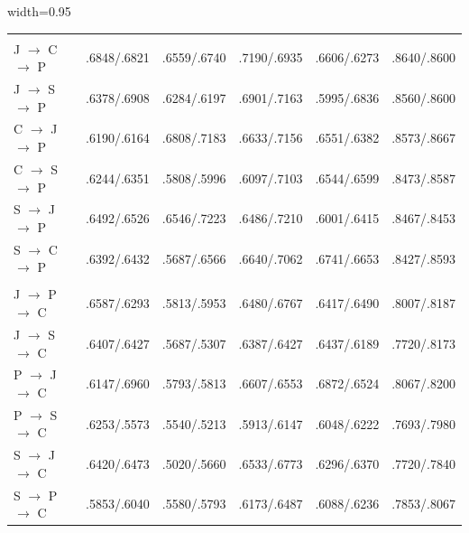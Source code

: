 \begin{table}[!htbp]
\begin{adjustbox}{width=0.95\columnwidth}
\begin{tabular}{@{}lccccc@{}}
\addlinespace[1pt]
\rowcolor{black!7}
\multicolumn{6}{@{}l}{\textit{Target Python (P)}} \\

J $\rightarrow$ C $\rightarrow$ P
& .6848/.6821 & .6559/.6740 & .7190/.6935 & .6606/.6273 & .8640/.8600 \\
J $\rightarrow$ S $\rightarrow$ P
& .6378/.6908 & .6284/.6197 & .6901/.7163 & .5995/.6836 & .8560/.8600 \\
C $\rightarrow$ J $\rightarrow$ P
& .6190/.6164 & .6808/.7183 & .6633/.7156 & .6551/.6382 & .8573/.8667 \\
C $\rightarrow$ S $\rightarrow$ P
& .6244/.6351 & .5808/.5996 & .6097/.7103 & .6544/.6599 & .8473/.8587 \\
S $\rightarrow$ J $\rightarrow$ P
& .6492/.6526 & .6546/.7223 & .6486/.7210 & .6001/.6415 & .8467/.8453 \\
S $\rightarrow$ C $\rightarrow$ P
& .6392/.6432 & .5687/.6566 & .6640/.7062 & .6741/.6653 & .8427/.8593 \\

\addlinespace[1pt]
\rowcolor{black!7}
\multicolumn{6}{@{}l}{\textit{Target C++ (C)}} \\

J $\rightarrow$ P $\rightarrow$ C
& .6587/.6293 & .5813/.5953 & .6480/.6767 & .6417/.6490 & .8007/.8187 \\
J $\rightarrow$ S $\rightarrow$ C
& .6407/.6427 & .5687/.5307 & .6387/.6427 & .6437/.6189 & .7720/.8173 \\
P $\rightarrow$ J $\rightarrow$ C
& .6147/.6960 & .5793/.5813 & .6607/.6553 & .6872/.6524 & .8067/.8200 \\
P $\rightarrow$ S $\rightarrow$ C
& .6253/.5573 & .5540/.5213 & .5913/.6147 & .6048/.6222 & .7693/.7980 \\
S $\rightarrow$ J $\rightarrow$ C
& .6420/.6473 & .5020/.5660 & .6533/.6773 & .6296/.6370 & .7720/.7840 \\
S $\rightarrow$ P $\rightarrow$ C
& .5853/.6040 & .5580/.5793 & .6173/.6487 & .6088/.6236 & .7853/.8067 \\

\bottomrule
\end{tabular}
\end{adjustbox}
\end{table}
